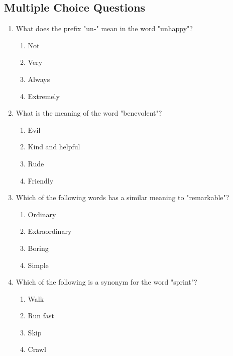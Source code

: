 \documentclass[12pt]{article}
\begin{document}
\onehalfspacing

\subsection*{Multiple Choice Questions}

\begin{enumerate}

    \item What does the prefix "un-" mean in the word "unhappy"?

    \begin{enumerate}[label=\Alph*.]
        \item Not
        \item Very
        \item Always
        \item Extremely
    \end{enumerate}
    
    \vspace{0.5cm}

    \item What is the meaning of the word "benevolent"?

    \begin{enumerate}[label=\Alph*.]
        \item Evil
        \item Kind and helpful
        \item Rude
        \item Friendly
    \end{enumerate}
    
    \vspace{0.5cm}

    \item Which of the following words has a similar meaning to "remarkable"?

    \begin{enumerate}[label=\Alph*.]
        \item Ordinary
        \item Extraordinary
        \item Boring
        \item Simple
    \end{enumerate}
    
    \vspace{0.5cm}

    \item Which of the following is a synonym for the word "sprint"?

    \begin{enumerate}[label=\Alph*.]
        \item Walk
        \item Run fast
        \item Skip
        \item Crawl
    \end{enumerate}
    

\end{enumerate}
\end{document}
